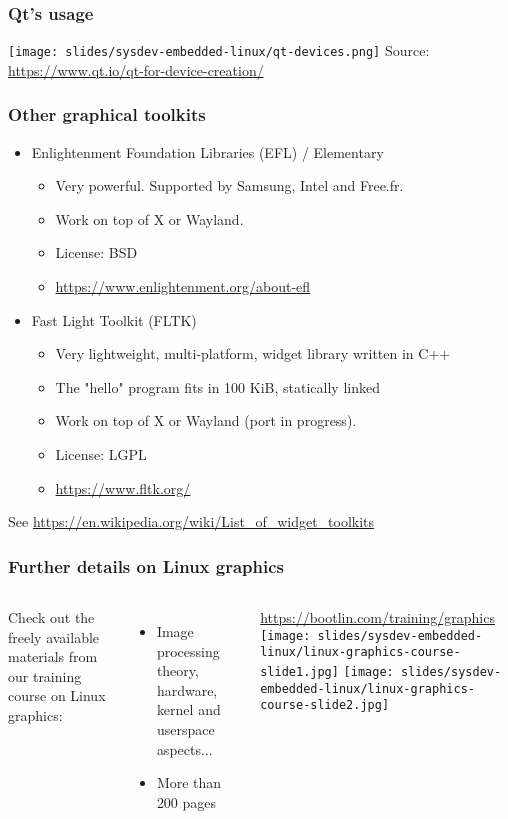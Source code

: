 \begin{frame}
  \frametitle{Qt's usage}
  \texttt{[image: slides/sysdev-embedded-linux/qt-devices.png]}
  \vfill
  Source: \url{https://www.qt.io/qt-for-device-creation/}
\end{frame}

\begin{frame}
  \frametitle{Other graphical toolkits}
  \begin{itemize}
  \item Enlightenment Foundation Libraries (EFL) / Elementary
    \begin{itemize}
    \item Very powerful. Supported by Samsung, Intel and Free.fr.
    \item Work on top of X or Wayland.
    \item License: BSD
    \item \url{https://www.enlightenment.org/about-efl}
    \end{itemize}
  \item Fast Light Toolkit (FLTK)
    \begin{itemize}
    \item Very lightweight, multi-platform, widget library written in C++
    \item The "hello" program fits in 100 KiB, statically linked
    \item Work on top of X or Wayland (port in progress).
    \item License: LGPL
    \item \url{https://www.fltk.org/}
    \end{itemize}
  \end{itemize}
  See \url{https://en.wikipedia.org/wiki/List_of_widget_toolkits}
\end{frame}

\begin{frame}
  \frametitle{Further details on Linux graphics}
  \begin{columns}
    Check out the freely available materials
    from our training course on Linux graphics:
    \begin{itemize}
      \item Image processing theory, hardware,
            kernel and userspace aspects...
      \item More than 200 pages
    \end{itemize}
    \url{https://bootlin.com/training/graphics}
    \texttt{[image: slides/sysdev-embedded-linux/linux-graphics-course-slide1.jpg]}
    \texttt{[image: slides/sysdev-embedded-linux/linux-graphics-course-slide2.jpg]}
  \end{columns}
\end{frame}


